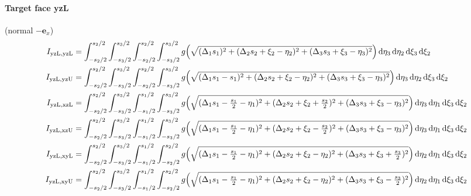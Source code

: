 \paragraph{Target face yzL} (normal $-\mathbf{e}_x$)
\begin{align*}
I_{\mathrm{yzL},\mathrm{yzL}} &= \int_{-s_2/2}^{s_2/2}\int_{-s_3/2}^{s_3/2}\int_{-s_2/2}^{s_2/2}\int_{-s_3/2}^{s_3/2} g\Bigl(\sqrt{(\Delta_1 s_1)^2 + (\Delta_2 s_2 + \xi_2 - \eta_2)^2 + (\Delta_3 s_3 + \xi_3 - \eta_3)^2}\Bigr)\,\mathrm{d}\eta_3\,\mathrm{d}\eta_2\,\mathrm{d}\xi_3\,\mathrm{d}\xi_2 \\I_{\mathrm{yzL},\mathrm{yzU}} &= \int_{-s_2/2}^{s_2/2}\int_{-s_3/2}^{s_3/2}\int_{-s_2/2}^{s_2/2}\int_{-s_3/2}^{s_3/2} g\Bigl(\sqrt{(\Delta_1 s_1 - s_1)^2 + (\Delta_2 s_2 + \xi_2 - \eta_2)^2 + (\Delta_3 s_3 + \xi_3 - \eta_3)^2}\Bigr)\,\mathrm{d}\eta_3\,\mathrm{d}\eta_2\,\mathrm{d}\xi_3\,\mathrm{d}\xi_2 \\I_{\mathrm{yzL},\mathrm{xzL}} &= \int_{-s_2/2}^{s_2/2}\int_{-s_3/2}^{s_3/2}\int_{-s_1/2}^{s_1/2}\int_{-s_3/2}^{s_3/2} g\Bigl(\sqrt{(\Delta_1 s_1 - \tfrac{s_1}{2} - \eta_1)^2 + (\Delta_2 s_2 + \xi_2 + \tfrac{s_2}{2})^2 + (\Delta_3 s_3 + \xi_3 - \eta_3)^2}\Bigr)\,\mathrm{d}\eta_3\,\mathrm{d}\eta_1\,\mathrm{d}\xi_3\,\mathrm{d}\xi_2 \\I_{\mathrm{yzL},\mathrm{xzU}} &= \int_{-s_2/2}^{s_2/2}\int_{-s_3/2}^{s_3/2}\int_{-s_1/2}^{s_1/2}\int_{-s_3/2}^{s_3/2} g\Bigl(\sqrt{(\Delta_1 s_1 - \tfrac{s_1}{2} - \eta_1)^2 + (\Delta_2 s_2 + \xi_2 - \tfrac{s_2}{2})^2 + (\Delta_3 s_3 + \xi_3 - \eta_3)^2}\Bigr)\,\mathrm{d}\eta_3\,\mathrm{d}\eta_1\,\mathrm{d}\xi_3\,\mathrm{d}\xi_2 \\I_{\mathrm{yzL},\mathrm{xyL}} &= \int_{-s_2/2}^{s_2/2}\int_{-s_3/2}^{s_3/2}\int_{-s_1/2}^{s_1/2}\int_{-s_2/2}^{s_2/2} g\Bigl(\sqrt{(\Delta_1 s_1 - \tfrac{s_1}{2} - \eta_1)^2 + (\Delta_2 s_2 + \xi_2 - \eta_2)^2 + (\Delta_3 s_3 + \xi_3 + \tfrac{s_3}{2})^2}\Bigr)\,\mathrm{d}\eta_2\,\mathrm{d}\eta_1\,\mathrm{d}\xi_3\,\mathrm{d}\xi_2 \\I_{\mathrm{yzL},\mathrm{xyU}} &= \int_{-s_2/2}^{s_2/2}\int_{-s_3/2}^{s_3/2}\int_{-s_1/2}^{s_1/2}\int_{-s_2/2}^{s_2/2} g\Bigl(\sqrt{(\Delta_1 s_1 - \tfrac{s_1}{2} - \eta_1)^2 + (\Delta_2 s_2 + \xi_2 - \eta_2)^2 + (\Delta_3 s_3 + \xi_3 - \tfrac{s_3}{2})^2}\Bigr)\,\mathrm{d}\eta_2\,\mathrm{d}\eta_1\,\mathrm{d}\xi_3\,\mathrm{d}\xi_2
\end{align*}
